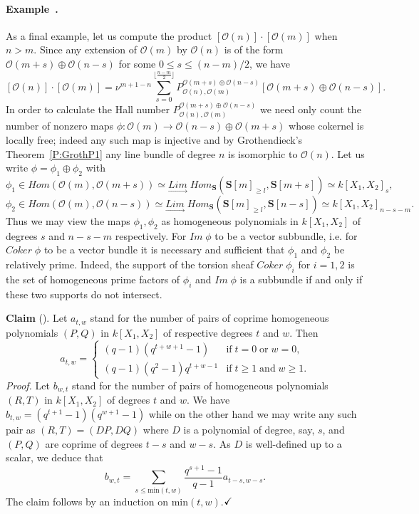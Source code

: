 \documentclass[a4paper,10pt]{amsart}
\def\qed{$\hfill \checkmark$}
\def\O{\mathcal{O}}
\numberwithin{equation}{section}
\begin{document}
\paragraph{\textbf{Example~\thetheo.}} As a final example, let us compute the product $[\O(n)]\cdot[\O(m)]$ when $n > m$. Since any extension of $\O(m)$ by $\O(n)$ is of the form $\O(m+s) \oplus \O(n-s)$ for some $0 \leq s \leq (n-m)/2$, we have
$$[\O(n)] \cdot [\O(m)]=\nu^{m+1-n}\sum_{s=0}^{\lfloor \frac{n-m}{2}\rfloor} P_{\O(n),\O(m)}^{\O(m+s) \oplus\O(n-s)} [\O(m+s) \oplus \O(n-s)].$$
In order to calculate the Hall number $P_{\O(n),\O(m)}^{\O(m+s) \oplus\O(n-s)}$ we need only count the number of nonzero maps $\phi: \mathcal{O}(m) \to \O(n-s) \oplus \O(m+s)$ whose cokernel is locally free; indeed any such map is injective and by Grothendieck's Theorem~\ref{P:GrothP1} any line bundle of degree $n$ is isomorphic to $\O(n)$. Let us write $\phi=\phi_1\oplus\phi_2$ with
$$\phi_1\in {Hom}(\O(m),\O(m+s)) \simeq \underset{\longrightarrow}{{Lim}} \;{Hom}_{\mathbf{S}}(\mathbf{S}[m]_{\geq l}, \mathbf{S}[m+s]) \simeq k[X_1,X_2]_s,$$
$$\phi_2\in {Hom}(\O(m),\O(n-s)) \simeq \underset{\longrightarrow}{{Lim}} \;{Hom}_{\mathbf{S}}(\mathbf{S}[m]_{\geq l}, \mathbf{S}[n-s]) \simeq k[X_1,X_2]_{n-s-m}.$$
Thus we may view the maps $\phi_1, \phi_2$ as homogeneous polynomials in $k[X_1,X_2]$ of degrees $s$ and $n-s-m$ respectively. For ${Im}\;\phi$ to be a vector subbundle, i.e. for ${Coker}\;\phi$ to be a vector bundle it is necessary and sufficient that $\phi_1$ and $\phi_2$ be relatively prime. Indeed, the support of the torsion sheaf ${Coker}\;\phi_i$ for $i=1, 2$ is the set of homogeneous prime factors of $\phi_i$ and ${Im}\;\phi$ is a subbundle if and only if these two supports do not intersect.
\vspace{.05in}

\textbf{Claim} (\cite{BK}). Let $a_{t,w}$ stand for the number of pairs of coprime homogeneous polynomials $(P,Q)$ in $k[X_1,X_2]$ of respective degrees $t$ and $w$. Then
$$a_{t,w}=\begin{cases} (q-1)(q^{t+w+1}-1)&\text{if}\;t=0\;\text{or}\;w=0,\\
(q-1)(q^2-1)q^{t+w-1}&\text{if}\;t\geq 1\;\text{and}\;w \geq 1.
\end{cases}$$
\noindent
\textit{Proof.} Let $b_{w,t}$ stand for the number of pairs of homogeneous polynomials $(R,T)$ in $k[X_1,X_2]$ of degrees $t$ and $w$. We have $b_{t,w}=(q^{t+1}-1)(q^{w+1}-1)$ while on the other hand we may write any such pair as $(R,T)=(DP,DQ)$ where $D$ is a polynomial of degree, say, $s$, and $(P,Q)$ are coprime of degrees $t-s$ and $w-s$. As $D$ is well-defined up to a scalar, we deduce that
$$b_{w,t}=\sum_{s \leq \text{min}(t,w)} \frac{q^{s+1}-1}{q-1} a_{t-s,w-s}.$$
The claim follows by an induction on $\text{min}(t,w)$.\qed
\end{document}
